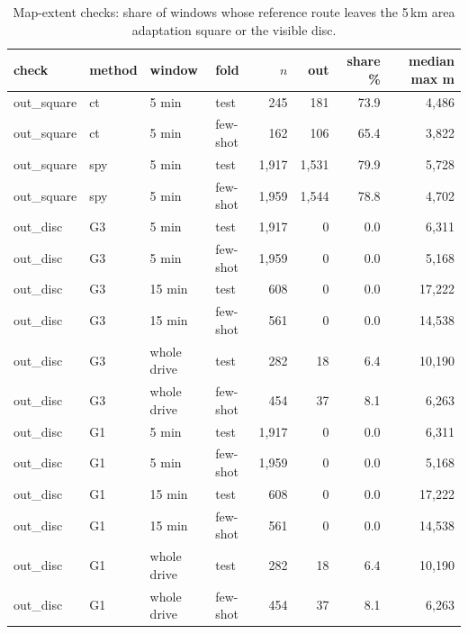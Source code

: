 \begin{table}[t]\centering\scriptsize\setlength{\tabcolsep}{3pt}
\caption{Map-extent checks: share of windows whose reference route leaves the 5\,km area adaptation square or the visible disc.}\label{tab:supp_area}
\begin{tabular}{llllrrrr}\toprule
check & method & window & fold & $n$ & out & share \% & median max m \\\midrule
out\_square & ct & 5 min & test & 245 & 181 & 73.9 & 4{,}486 \\
out\_square & ct & 5 min & few-shot & 162 & 106 & 65.4 & 3{,}822 \\
out\_square & spy & 5 min & test & 1{,}917 & 1{,}531 & 79.9 & 5{,}728 \\
out\_square & spy & 5 min & few-shot & 1{,}959 & 1{,}544 & 78.8 & 4{,}702 \\
out\_disc & G3 & 5 min & test & 1{,}917 & 0 & 0.0 & 6{,}311 \\
out\_disc & G3 & 5 min & few-shot & 1{,}959 & 0 & 0.0 & 5{,}168 \\
out\_disc & G3 & 15 min & test & 608 & 0 & 0.0 & 17{,}222 \\
out\_disc & G3 & 15 min & few-shot & 561 & 0 & 0.0 & 14{,}538 \\
out\_disc & G3 & whole drive & test & 282 & 18 & 6.4 & 10{,}190 \\
out\_disc & G3 & whole drive & few-shot & 454 & 37 & 8.1 & 6{,}263 \\
out\_disc & G1 & 5 min & test & 1{,}917 & 0 & 0.0 & 6{,}311 \\
out\_disc & G1 & 5 min & few-shot & 1{,}959 & 0 & 0.0 & 5{,}168 \\
out\_disc & G1 & 15 min & test & 608 & 0 & 0.0 & 17{,}222 \\
out\_disc & G1 & 15 min & few-shot & 561 & 0 & 0.0 & 14{,}538 \\
out\_disc & G1 & whole drive & test & 282 & 18 & 6.4 & 10{,}190 \\
out\_disc & G1 & whole drive & few-shot & 454 & 37 & 8.1 & 6{,}263 \\
\bottomrule\end{tabular}
\end{table}

